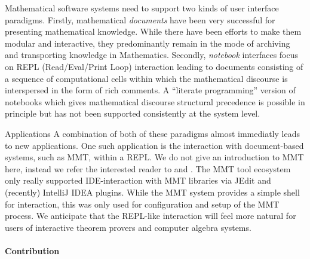 Mathematical software systems need to support two kinds of user interface paradigms.
Firstly, mathematical \emph{documents} have been very successful for presenting mathematical knowledge.
While there have been efforts to make them modular and interactive, they predominantly remain in the mode of archiving and transporting knowledge in Mathematics.
Secondly, \emph{notebook} interfaces focus on REPL (Read/Eval/Print Loop) interaction leading to documents consisting of a sequence of computational cells within which the mathematical discourse is interspersed in the form of rich comments.
A ``literate programming'' version of notebooks which gives mathematical discourse structural precedence is possible in principle but has not been supported consistently at the system level.

\begin{newpart}{Applications}
A combination of both of these paradigms almost immediatly leads to new applications. 
One such application is the interaction with document-based systems, such as MMT, within a REPL.
We do not give an introduction to MMT here, instead we refer the interested reader to \cite{RabKoh:WSMSML13} and \cite{uniformal:URL}. 
The MMT tool ecosystem only really supported IDE-interaction with MMT libraries via JEdit and (recently) IntelliJ IDEA plugins. 
While the MMT system provides a simple shell for interaction, this was only used for configuration and setup of the MMT process.
We anticipate that the REPL-like interaction will feel more natural for users of interactive theorem provers and computer algebra systems.
\end{newpart}

\paragraph{Contribution}

